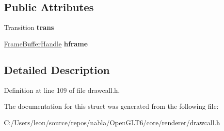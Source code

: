 \subsection*{Public Attributes}
\begin{DoxyCompactItemize}
\item 
\mbox{\label{structnabla_1_1renderer_1_1_switch_frame_buffer_draw_call_a23f83f2a053e616ff6c751f19da48b38}} 
Transition {\bfseries trans}
\item 
\mbox{\label{structnabla_1_1renderer_1_1_switch_frame_buffer_draw_call_aee0b932a412f28d09504f12f4ec9afc0}} 
\mbox{\hyperlink{classnabla_1_1renderer_1_1_handle}{Frame\+Buffer\+Handle}} {\bfseries hframe}
\end{DoxyCompactItemize}


\subsection{Detailed Description}


Definition at line 109 of file drawcall.\+h.



The documentation for this struct was generated from the following file\+:\begin{DoxyCompactItemize}
\item 
C\+:/\+Users/leon/source/repos/nabla/\+Open\+G\+L\+T6/core/renderer/drawcall.\+h\end{DoxyCompactItemize}
